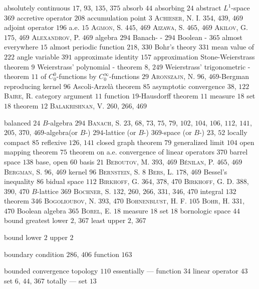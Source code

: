 \label{chap:IndexStale}

absolutely continuous $17$, $93$, $135$, $375$ absorb $44$ absorbing $24$ abstract $L^1$-space $369$ accretive operator $208$ accumulation point $3$ \textsc{Achieser}, N. I. $354$, $439$, $469$ adjoint operator $196$ a.e. $15$ \textsc{Agmon}, S. $445$, $469$ \textsc{Aizawa}, S. $465$, $469$ \textsc{Akilov}, G. $175$, $469$ \textsc{Alexandrov}, P. $469$ algebra $294$ Banach- - $294$ Boolean - $365$ almost everywhere $15$ almost periodic function $218$, $330$ Bohr's theory $331$ mean value of $222$ angle variable $391$ approximate identity $157$ approximation Stone-Weierstrass theorem $9$ Weierstrass' polynomial - theorem $8$, $249$ Weierstrass' trigonometric - theorem $11$ of $C_0^0$-functions by $C_0^\infty$-functions $29$ \textsc{Aronszajn}, N. $96$, $469$-Bergman reproducing kernel $96$ Ascoli-Arzelà theorem $85$ asymptotic convergence $38$, $122$ \textsc{Baire}, R. category argument $11$ function $19$-Hausdorff theorem $11$ measure $18$ set $18$ theorem $12$ \textsc{Balakrishnan}, V. $260$, $266$, $469$ 

balanced $24$ $B$-algebra $294$ \textsc{Banach}, S. $23$, $68$, $73$, $75$, $79$, $102$, $104$, $106$, $112$, $141$, $205$, $370$, $469$-algebra(or $B$-) $294$-lattice (or $B$-) $369$-space (or $B$-) $23$, $52$ locally compact $85$ reflexive $126$, $141$ closed graph theorem $79$ generalized limit $104$ open mapping theorem $75$ theorem on a.e. convergence of linear operators $370$ barrel space $138$ base, open $60$ basis $21$ \textsc{Beboutov}, M. $393$, $469$ \textsc{Bénilan}, P. $465$, $469$ \textsc{Bergman}, S. $96$, $469$ kernel $96$ \textsc{Bernstein}, S. $8$ \textsc{Bers}, L. $178$, $469$ Bessel's inequality $86$ bidual space $112$ \textsc{Birkhoff}, G. $364$, $378$, $470$ \textsc{Birkhoff}, G. D. $388$, $390$, $470$ $B$-lattice $369$ \textsc{Bochner}, S. $132$, $260$, $266$, $331$, $346$, $470$ integral $132$ theorem $346$ \textsc{Bogolioubov}, N. $393$, $470$ \textsc{Bohnenblust}, H. F. $105$ \textsc{Bohr}, H. $331$, $470$ Boolean algebra $365$ \textsc{Borel}, E. $18$ measure $18$ set $18$ bornologic space $44$ bound greatest lower $2$, $367$ least upper $2$, $367$ 

bound lower $2$ upper $2$

boundary condition $286$, $406$ function $163$

bounded convergence topology $110$ essentially --- function $34$ linear operator $43$ set $6$, $44$, $367$ totally --- set $13$


